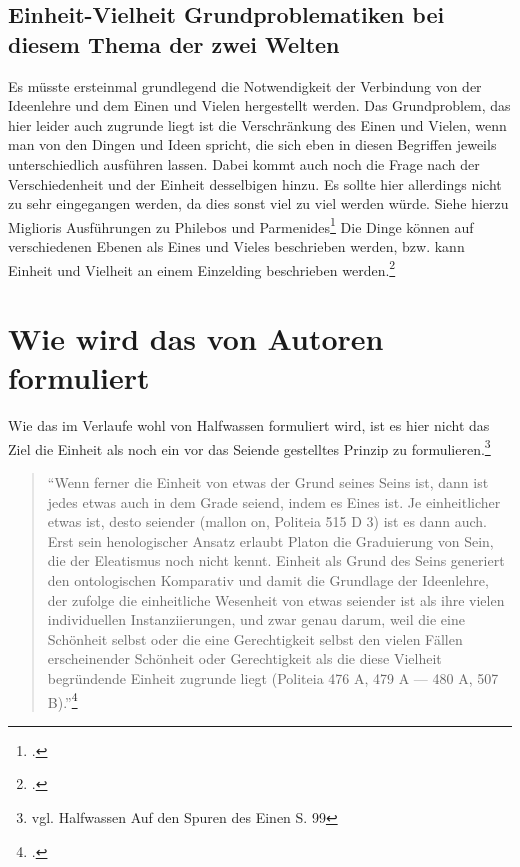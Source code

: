 \documentclass[12pt]{article}
\newcommand*{\zitatblock}[1]{%
    \begin{quote}
    \fontsize{10}{12}\selectfont
    \setlength{\parskip}{1.0em}
    #1
    \end{quote}
}
\begin{document}
\subsection{Einheit-Vielheit Grundproblematiken bei diesem Thema der zwei Welten}
Es müsste ersteinmal grundlegend die Notwendigkeit der Verbindung von der Ideenlehre und dem Einen und Vielen hergestellt werden. 
Das Grundproblem, das hier leider auch zugrunde liegt ist die Verschränkung des Einen und Vielen, wenn man von den Dingen und Ideen spricht, die sich eben in diesen Begriffen jeweils unterschiedlich ausführen lassen. Dabei kommt auch noch die Frage nach der Verschiedenheit und der Einheit desselbigen hinzu.
Es sollte hier allerdings nicht zu sehr eingegangen werden, da dies sonst viel zu viel werden würde.
Siehe hierzu Miglioris Ausführungen zu Philebos und Parmenides\footcite[vgl.][S. 110ff.]{Migliori}
Die Dinge können auf verschiedenen Ebenen als Eines und Vieles beschrieben werden, bzw. kann Einheit und Vielheit an einem Einzelding beschrieben werden.\footcite[vgl.][S. 112]{Migliori}

\section{Wie wird das von Autoren formuliert}
Wie das im Verlaufe wohl von Halfwassen formuliert wird, ist es hier nicht das Ziel die Einheit als noch ein vor das Seiende gestelltes Prinzip zu formulieren.\footnote{vgl. Halfwassen Auf den Spuren des Einen S. 99}
\zitatblock{\enquote{Wenn ferner die Einheit von etwas der Grund seines Seins ist, dann ist jedes etwas auch in dem Grade seiend, indem es Eines ist. Je einheitlicher etwas ist, desto seiender (mallon on, Politeia 515 D 3) ist es dann auch. Erst sein henologischer Ansatz erlaubt Platon die Graduierung von Sein, die der Eleatismus noch nicht kennt. Einheit als Grund des Seins generiert den ontologischen Komparativ und damit die Grundlage der Ideenlehre, der zufolge die einheitliche Wesenheit von etwas seiender ist als ihre vielen individuellen Instanziierungen, und zwar genau darum, weil die eine Schönheit selbst oder die eine Gerechtigkeit selbst den vielen Fällen erscheinender Schönheit oder Gerechtigkeit als die diese Vielheit begründende Einheit zugrunde liegt (Politeia 476 A, 479 A — 480 A, 507 B).}\footcite[][S. 99f.]{halfwassen2015spuren}}
\end{document}
